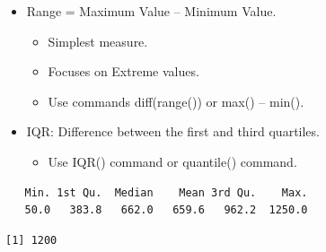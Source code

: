 \documentclass[
  letterpaper,
  DIV=11,
  numbers=noendperiod]{scrreprt}
\newenvironment{Shaded}{\begin{snugshade}}{\end{snugshade}}
\newcommand{\AttributeTok}[1]{\textcolor[rgb]{0.40,0.45,0.13}{#1}}
\newcommand{\ConstantTok}[1]{\textcolor[rgb]{0.56,0.35,0.01}{#1}}
\newcommand{\FunctionTok}[1]{\textcolor[rgb]{0.28,0.35,0.67}{#1}}
\newcommand{\NormalTok}[1]{\textcolor[rgb]{0.00,0.23,0.31}{#1}}
\newcommand{\SpecialCharTok}[1]{\textcolor[rgb]{0.37,0.37,0.37}{#1}}
\providecommand{\tightlist}{%
  \setlength{\itemsep}{0pt}\setlength{\parskip}{0pt}}\usepackage{longtable,booktabs,array}
\begin{document}
\begin{itemize}
\tightlist
\item
  Range = Maximum Value -- Minimum Value.

  \begin{itemize}
  \tightlist
  \item
    Simplest measure.
  \item
    Focuses on Extreme values.
  \item
    Use commands diff(range()) or max() -- min().
  \end{itemize}
\item
  IQR: Difference between the first and third quartiles.

  \begin{itemize}
  \tightlist
  \item
    Use IQR() command or quantile() command.
  \end{itemize}
\end{itemize}

\begin{Shaded}
\end{Shaded}

\begin{verbatim}
   Min. 1st Qu.  Median    Mean 3rd Qu.    Max. 
   50.0   383.8   662.0   659.6   962.2  1250.0 
\end{verbatim}

\begin{Shaded}
\end{Shaded}

\begin{verbatim}
[1] 1200
\end{verbatim}

\begin{Shaded}
\end{Shaded}
\end{document}
